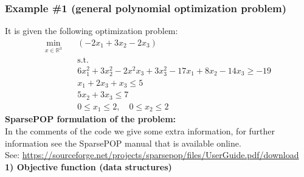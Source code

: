 \subsubsection{Example \#1 (general polynomial optimization problem)}
It is given the following optimization problem:
\begin{align*}
    \min_{x\in\mathbb{R}^3} \quad &(-2x_1+ 3x_2 -2 x_3) \\
    &\text{s.t.}\\
    &6x_1^2+3x_2^2-2x^2x_3 + 3x_3^2-17x_1+8x_2-14x_3 \ge -19\\
    &x_1 + 2 x_3 + x_3 \le 5\\
    &5x_2 + 3 x_3 \le 7\\
    &0\le x_1 \le 2, \quad 0 \le x_2 \le 2
\end{align*}
\noindent
\textsf{\large\textbf{SparsePOP formulation of the problem:}}\\
In the comments of the code we give some extra information, for further information see  the SparsePOP manual that is available online. \\
See: \href{URL} {https://sourceforge.net/projects/sparsepop/files/UserGuide.pdf/download}\\

\noindent
\textbf{\textsf{1) Objective function (data structures)}}

